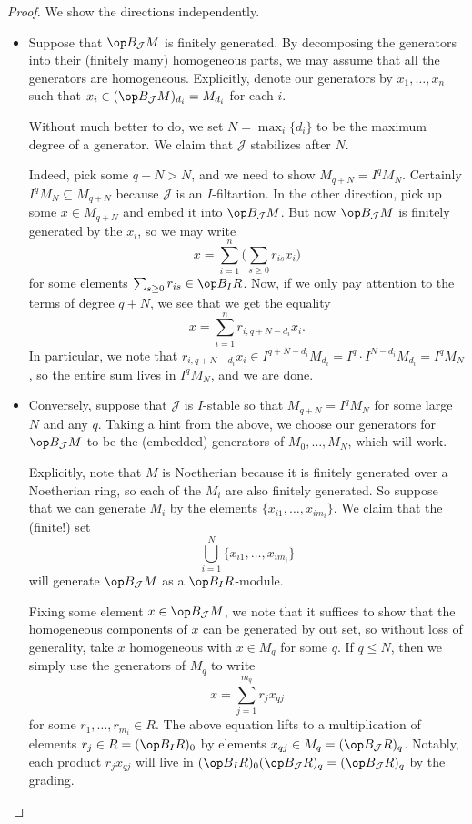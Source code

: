 \begin{proof}
	We show the directions independently.
	\begin{itemize}
		\item Suppose that $\op B_\mathcal JM$ is finitely generated. By decomposing the generators into their (finitely many) homogeneous parts, we may assume that all the generators are homogeneous. Explicitly, denote our generators by $x_1,\ldots,x_n$ such that $x_i\in(\op B_\mathcal JM)_{d_i}=M_{d_i}$ for each $i$.
		
		Without much better to do, we set $N=\max_i\{d_i\}$ to be the maximum degree of a generator. We claim that $\mathcal J$ stabilizes after $N$.

		Indeed, pick some $q+N>N$, and we need to show $M_{q+N}=I^qM_N$. Certainly $I^qM_N\subseteq M_{q+N}$ because $\mathcal J$ is an $I$-filtartion. In the other direction, pick up some $x\in M_{q+N}$ and embed it into $\op B_\mathcal JM$. But now $\op B_\mathcal JM$ is finitely generated by the $x_i$, so we may write
		\[x=\sum_{i=1}^n\Bigg(\sum_{s\ge0}r_{is}x_i\Bigg)\]
		for some elements $\sum_{s\ge0}r_{is}\in\op B_IR$. Now, if we only pay attention to the terms of degree $q+N$, we see that we get the equality
		\[x=\sum_{i=1}^nr_{i,q+N-d_i}x_i.\]
		In particular, we note that $r_{i,q+N-d_i}x_i\in I^{q+N-d_i}M_{d_i}=I^q\cdot I^{N-d_i}M_{d_i}=I^qM_N$, so the entire sum lives in $I^qM_N$, and we are done.

		\item Conversely, suppose that $\mathcal J$ is $I$-stable so that $M_{q+N}=I^qM_N$ for some large $N$ and any $q$. Taking a hint from the above, we choose our generators for $\op B_\mathcal JM$ to be the (embedded) generators of $M_0,\ldots,M_N$, which will work.

		Explicitly, note that $M$ is Noetherian because it is finitely generated over a Noetherian ring, so each of the $M_i$ are also finitely generated. So suppose that we can generate $M_i$ by the elements $\{x_{i1},\ldots,x_{im_i}\}$. We claim that the (finite!) set
		\[\bigcup_{i=1}^N\{x_{i1},\ldots,x_{im_i}\}\]
		will generate $\op B_{\mathcal J}M$ as a $\op B_IR$-module.

		Fixing some element $x\in\op B_\mathcal JM$, we note that it suffices to show that the homogeneous components of $x$ can be generated by out set, so without loss of generality, take $x$ homogeneous with $x\in M_q$ for some $q$. If $q\le N$, then we simply use the generators of $M_q$ to write
		\[x=\sum_{j=1}^{m_q}r_jx_{qj}\]
		for some $r_1,\ldots,r_{m_i}\in R$. The above equation lifts to a multiplication of elements $r_j\in R=(\op B_IR)_0$ by elements $x_{qj}\in M_q=(\op B_\mathcal JR)_q$. Notably, each product $r_jx_{qj}$ will live in $(\op B_IR)_0(\op B_\mathcal JR)_q=(\op B_\mathcal JR)_q$ by the grading.


\end{itemize}
\end{proof}
